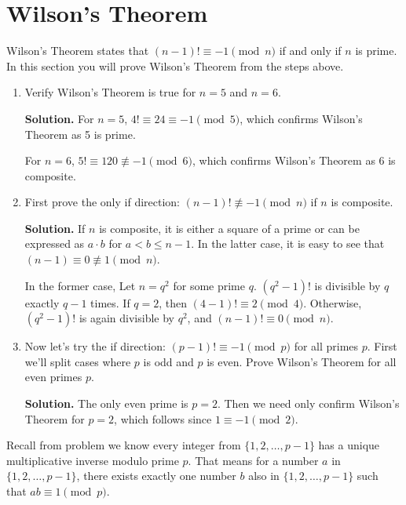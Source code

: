 \documentclass[11pt]{article}
\theoremstyle{definition}
\begin{document}
\section{Wilson's Theorem}
Wilson's Theorem states that $(n - 1)! \equiv -1 \pmod{n}$ if and only if $n$ is prime. In this section you will prove Wilson's Theorem from the steps above.

\begin{enumerate} \addtocounter{enumi}{\value{problem_count}}

\item \addtocounter{problem_count}{1}
Verify Wilson's Theorem is true for $n = 5$ and $n = 6$.

\textbf{Solution.}
For $n = 5$, $4! \equiv 24 \equiv -1 \pmod{5}$, which confirms Wilson's Theorem as 5 is prime.

For $n = 6$, $5! \equiv 120 \not\equiv -1 \pmod{6}$, which confirms Wilson's Theorem as 6 is composite.

\item \addtocounter{problem_count}{1}
First prove the only if direction:  $(n - 1)! \not\equiv -1 \pmod{n}$ if $n$ is composite.

\textbf{Solution.}
If $n$ is composite, it is either a square of a prime or can be expressed as $a \cdot b$ for $a < b \le n - 1$. In the latter case, it is easy to see that $(n - 1) \equiv 0 \not\equiv 1 \pmod{n}$.

In the former case, Let $n = q^2$ for some prime $q$. $(q^2 - 1)!$ is divisible by $q$ exactly $q - 1$ times. If $q = 2$, then $(4 - 1)! \equiv 2 \pmod{4}$. Otherwise, $(q^2 - 1)!$ is again divisible by $q^2$, and $(n - 1)! \equiv 0 \pmod{n}$.

\item \addtocounter{problem_count}{1}
Now let's try the if direction: $(p - 1)! \equiv -1 \pmod{p}$ for all primes $p$. First we'll split cases where $p$ is odd and $p$ is even. Prove Wilson's Theorem for all even primes $p$.

\textbf{Solution.}
The only even prime is $p = 2$. Then we need only confirm Wilson's Theorem for $p = 2$, which follows since $1 \equiv -1 \pmod{2}$.

\end{enumerate}

Recall from problem  we know every integer from $\{1, 2, \ldots, p - 1\}$ has a unique multiplicative inverse modulo prime $p$. That means for a number $a$ in $\{1, 2, \ldots, p - 1\}$, there exists exactly one number $b$ also in $\{1, 2, \ldots, p - 1\}$ such that $ab \equiv 1 \pmod{p}$.
\end{document}
